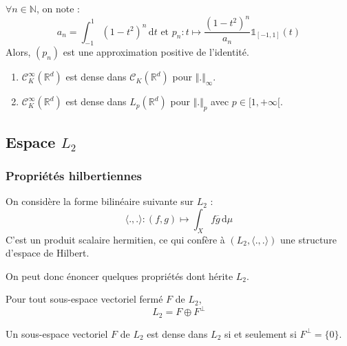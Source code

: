 	\begin{example}
		$\forall n \in \mathbb{N}$, on note :
		\[ a_n = \int_{-1}^1 (1-t^2)^n \, \mathrm{d}t \text{ et } p_n : t \mapsto \frac{(1-t^2)^n}{a_n} \mathbb{1}_{[-1, 1]}(t) \]
		Alors, $(p_n)$ est une approximation positive de l'identité.
	\end{example}


	\begin{application}
		\begin{enumerate}[label=(\roman*)]
			\item $\mathcal{C}^\infty_K(\mathbb{R}^d)$ est dense dans $\mathcal{C}_K(\mathbb{R}^d)$ pour $\Vert . \Vert_\infty$.
			\item $\mathcal{C}^\infty_K(\mathbb{R}^d)$ est dense dans $L_p(\mathbb{R}^d)$ pour $\Vert . \Vert_p$ avec $p \in [1, +\infty[$.
		\end{enumerate}
	\end{application}

	\subsection{Espace \texorpdfstring{$L_2$}{L₂}}

	\subsubsection{Propriétés hilbertiennes}


	\begin{definition}
		On considère la forme bilinéaire suivante sur $L_2$ :
		\[ \langle ., . \rangle : (f, g) \mapsto \int_X f \overline{g} \, \mathrm{d}\mu \]
		C'est un produit scalaire hermitien, ce qui confère à $(L_2, \langle ., . \rangle)$ une structure d'espace de Hilbert.
	\end{definition}

	On peut donc énoncer quelques propriétés dont hérite $L_2$.


	\begin{theorem}
		Pour tout sous-espace vectoriel fermé $F$ de $L_2$,
		\[ L_2 = F \oplus F^\perp \]
	\end{theorem}

	\begin{corollary}
		Un sous-espace vectoriel $F$ de $L_2$ est dense dans $L_2$ si et seulement si $F^\perp = \{ 0 \}$.
	\end{corollary}

